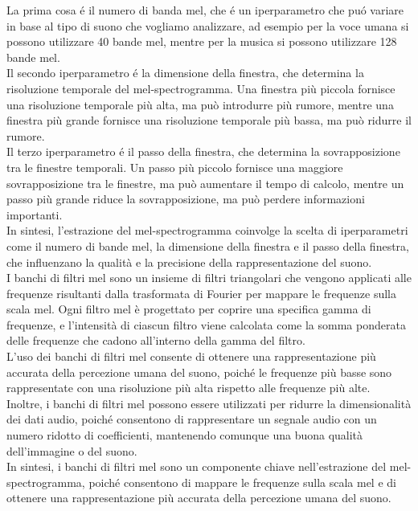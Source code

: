 La prima cosa é il numero di banda mel, che é un iperparametro che puó variare in base al tipo di suono che vogliamo analizzare, ad esempio per la voce umana si possono utilizzare 40 bande mel, mentre per la musica si possono utilizzare 128 bande mel.\\
Il secondo iperparametro é la dimensione della finestra, che determina la risoluzione temporale del mel-spectrogramma. Una finestra più piccola fornisce una risoluzione temporale più alta, ma può introdurre più rumore, mentre una finestra più grande fornisce una risoluzione temporale più bassa, ma può ridurre il rumore.\\
Il terzo iperparametro é il passo della finestra, che determina la sovrapposizione tra le finestre temporali. Un passo più piccolo fornisce una maggiore sovrapposizione tra le finestre, ma può aumentare il tempo di calcolo, mentre un passo più grande riduce la sovrapposizione, ma può perdere informazioni importanti.\\
In sintesi, l'estrazione del mel-spectrogramma coinvolge la scelta di iperparametri come il numero di bande mel, la dimensione della finestra e il passo della finestra, che influenzano la qualità e la precisione della rappresentazione del suono.\\

I banchi di filtri mel sono un insieme di filtri triangolari che vengono applicati alle frequenze risultanti dalla trasformata di Fourier per mappare le frequenze sulla scala mel. Ogni filtro mel è progettato per coprire una specifica gamma di frequenze, e l'intensità di ciascun filtro viene calcolata come la somma ponderata delle frequenze che cadono all'interno della gamma del filtro.\\
L'uso dei banchi di filtri mel consente di ottenere una rappresentazione più accurata della percezione umana del suono, poiché le frequenze più basse sono rappresentate con una risoluzione più alta rispetto alle frequenze più alte.\\
Inoltre, i banchi di filtri mel possono essere utilizzati per ridurre la dimensionalità dei dati audio, poiché consentono di rappresentare un segnale audio con un numero ridotto di coefficienti, mantenendo comunque una buona qualità dell'immagine o del suono.\\
In sintesi, i banchi di filtri mel sono un componente chiave nell'estrazione del mel-spectrogramma, poiché consentono di mappare le frequenze sulla scala mel e di ottenere una rappresentazione più accurata della percezione umana del suono.\\

